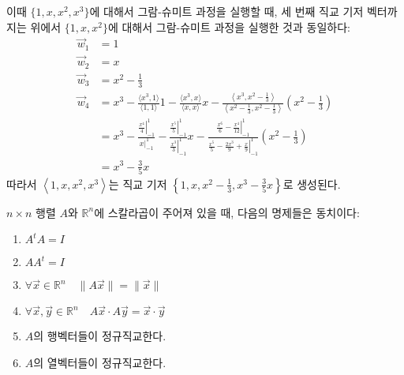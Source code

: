 \documentclass[../engineering_mathematics_lecture_note.tex]{subfiles}
\begin{document}
\begin{example}
\begin{enumerate}
            이때 $\{1, x, x^2, x^3\}$에 대해서 그람-슈미트 과정을 실행할 때, 세 번째 직교 기저 벡터까지는 위에서 $\{1, x, x^2\}$에 대해서 그람-슈미트 과정을 실행한 것과 동일하다:
            \begin{align*}
                \vec w_1 &= 1\\
                \vec w_2 &= x\\
                \vec w_3 &= x^2 - \frac13\\
                \vec w_4 &= x^3 - \frac{\langle x^3, 1 \rangle}{\langle 1, 1\rangle} 1 - \frac{\langle x^3, x\rangle}{\langle x, x \rangle} x - \frac{\left\langle x^3, x^2 - \frac13\right\rangle}{\left\langle x^2 - \frac13, x^2 - \frac13 \right\rangle} \left(x^2 - \frac13\right)\\
                         &= x^3 - \frac{\left.\frac{x^4}{4}\right|_{-1}^1}{\left. x \right|_{-1}^1} - \frac{\left. \frac{x^5}{5} \right|_{-1}^1}{\left. \frac{x^3}{3} \right|_{-1}^1} x - \frac{\left. \frac{x^6}{6} - \frac{x^4}{12} \right|_{-1}^1}{\left. \frac{x^5}{5} - \frac{2x^3}{9} + \frac x9 \right|_{-1}^1}\left(x^2 - \frac13\right)\\
                         &= x^3 - \frac{3}{5}x
            \end{align*}
            따라서 $\left< 1, x, x^2, x^3 \right>$는 직교 기저 $\left\{1, x, x^2 - \frac13, x^3 - \frac{3}{5}x\right\}$로 생성된다.
    \end{enumerate}
\end{example}

\begin{theorem} \label{thm:orthogonal_mat}
    $n \times n$ 행렬 $A$와 $\mathbb R^n$에 스칼라곱이 주어져 있을 때, 다음의 명제들은 동치이다:
    \begin{enumerate}
        \item $A^t A = I$
        \item $A A^t = I$
        \item $\forall \vec x \in \mathbb R^n \quad \lVert A \vec x \rVert = \lVert \vec x \rVert$
        \item $\forall \vec x, \vec y \in \mathbb R^n \quad A \vec x \cdot A \vec y = \vec x \cdot \vec y$
        \item $A$의 행벡터들이 정규직교한다.
        \item $A$의 열벡터들이 정규직교한다.
    \end{enumerate}
\end{theorem}
\end{document}
